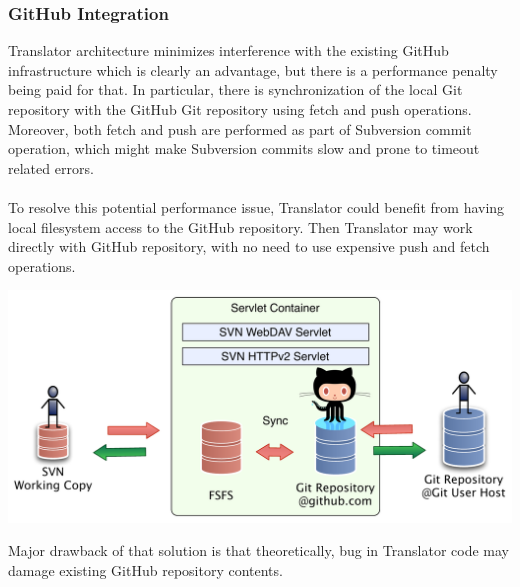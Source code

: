 \subsubsection{GitHub Integration}

Translator architecture minimizes interference with the existing GitHub infrastructure which is clearly an advantage, but there is a performance penalty being paid for that.
In particular, there is synchronization of the local Git repository with the GitHub Git repository using fetch and push operations. Moreover, both fetch and push are 
performed as part of Subversion commit operation, which might make Subversion commits slow and prone to timeout related errors.
\\\\
To resolve this potential performance issue, Translator could benefit from having local filesystem access to the GitHub repository. Then Translator may work directly with GitHub repository,
with no need to use expensive push and fetch operations.
\begin{center}
\includegraphics[width=\textwidth]{img/servlet/components_not_that_safe.pdf}%
\label{translator_components_pic2}%
\end{center}

Major drawback of that solution is that theoretically, bug in Translator code may damage existing GitHub repository contents.
